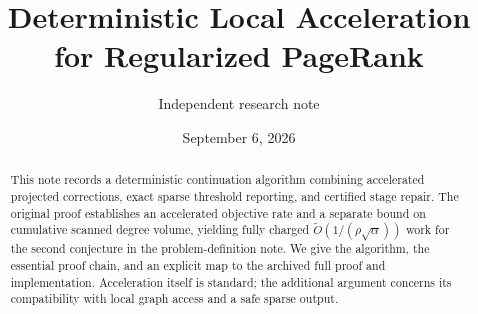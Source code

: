 \documentclass[11pt]{article}
\title{Deterministic Local Acceleration for Regularized PageRank}
\author{Independent research note}
\date{September 6, 2026}
\begin{document}
\maketitle
\begin{abstract}
This note records a deterministic continuation algorithm combining accelerated
projected corrections, exact sparse threshold reporting, and certified stage
repair. The original proof establishes an accelerated objective rate and a
separate bound on cumulative scanned degree volume, yielding fully charged
$\widetilde O(1/(\rho\sqrt\alpha))$ work for the second conjecture in the
problem-definition note. We give the algorithm, the essential proof chain,
and an explicit map to the archived full proof and implementation. Acceleration
itself is standard; the additional argument concerns its compatibility with
local graph access and a safe sparse output.
\end{abstract}




\end{document}
